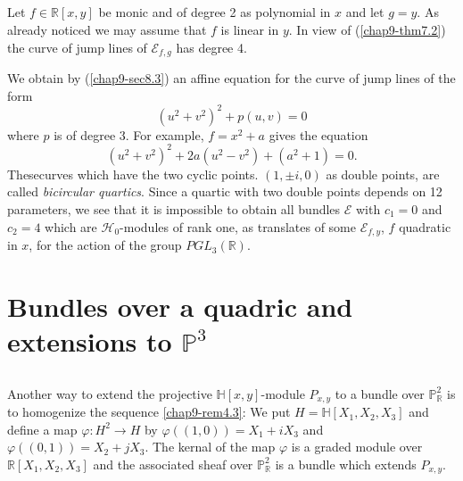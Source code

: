 \setcounter{subsection}{3}
\subsection{}\label{chap9-sec9.4}
Let $f\in \mathbb{R}[x,y]$ be monic and of degree 2 as polynomial in
$x$ and let $g=y$. As already noticed we may assume that $f$ is linear
in $y$. In view of (\ref{chap9-thm7.2}) the curve of jump lines of
$\mathscr{E}_{f,g}$ has degree 4.

We obtain by (\ref{chap9-sec8.3}) an affine equation for the curve of
jump lines of the form
$$
(u^{2}+v^{2})^{2}+p(u,v)=0
$$
where $p$ is of degree $3$. For example, $f=x^{2}+a$ gives the
equation
$$
(u^{2}+v^{2})^{2}+2a(u^{2}-v^{2})+(a^{2}+1)=0.
$$
These\pageoriginale curves which have the two cyclic points. $(1,\pm
i, 0)$ as double points, are called {\em bicircular quartics}. Since a
quartic with two double points depends on 12 parameters, we see that
it is impossible to obtain all bundles $\mathscr{E}$ with $c_{1}=0$
and $c_{2}=4$ which are $\mathscr{H}_{0}$-modules of rank one, as
translates of some $\mathscr{E}_{f,y}$, $f$ quadratic in $x$, for the
action of the group $PGL_{3}(\mathbb{R})$. 

\section{Bundles over a quadric and extensions to
\texorpdfstring{$\mathbb{P}^{3}$}{P3}}\label{chap9-sec10}

\subsection{}\label{chap9-sec10.1}
Another way to extend the projective $\mathbb{H}[x,y]$-module
$P_{x,y}$ to a bundle over $\mathbb{P}^{2}_{\mathbb{R}}$ is to
homogenize the sequence \ref{chap9-rem4.3}: We put
$H=\mathbb{H}[X_{1},X_{2},X_{3}]$ and define a map $\varphi:H^{2}\to
H$ by $\varphi((1,0))=X_{1}+iX_{3}$ and
$\varphi((0,1))=X_{2}+jX_{3}$. The kernal of the map $\varphi$ is a
graded module over $\mathbb{R}[X_{1},X_{2},X_{3}]$ and the associated
sheaf over $\mathbb{P}^{2}_{\mathbb{R}}$ is a bundle which extends
$P_{x,y}$. 

